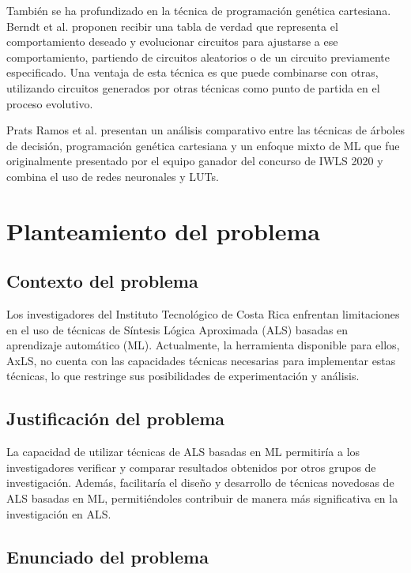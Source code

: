 También se ha profundizado en la técnica de programación genética cartesiana.
Berndt et al. \cite{berndt_cgp-based_2022} proponen recibir una tabla de verdad
que representa el comportamiento deseado y evolucionar circuitos para ajustarse
a ese comportamiento, partiendo de circuitos aleatorios o de un circuito
previamente especificado. Una ventaja de esta técnica es que puede combinarse
con otras, utilizando circuitos generados por otras técnicas como punto de
partida en el proceso evolutivo.

Prats Ramos et al. \cite{prats_ramos_impact_2024} presentan un análisis
comparativo entre las técnicas de árboles de decisión, programación genética
cartesiana y un enfoque mixto de ML que fue originalmente presentado por el
equipo ganador del concurso de IWLS 2020 \cite{rai_logic_2021} y combina el uso
de redes neuronales y LUTs.

\section{Planteamiento del problema}

\subsection{Contexto del problema}

Los investigadores del Instituto Tecnológico de Costa Rica enfrentan
limitaciones en el uso de técnicas de Síntesis Lógica Aproximada (ALS) basadas
en aprendizaje automático (ML). Actualmente, la herramienta disponible para
ellos, AxLS, no cuenta con las capacidades técnicas necesarias para implementar
estas técnicas, lo que restringe sus posibilidades de experimentación y
análisis.

\subsection{Justificación del problema}

La capacidad de utilizar técnicas de ALS basadas en ML permitiría a los
investigadores verificar y comparar resultados obtenidos por otros grupos de
investigación. Además, facilitaría el diseño y desarrollo de técnicas novedosas
de ALS basadas en ML, permitiéndoles contribuir de manera más significativa en
la investigación en ALS.

\subsection{Enunciado del problema}

